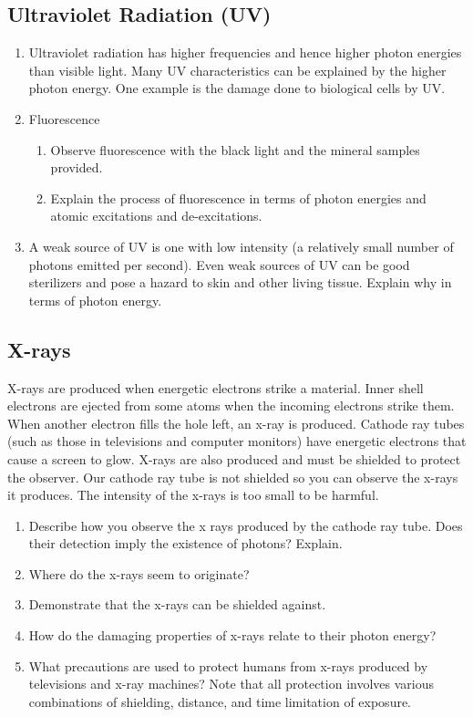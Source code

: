 \begin{multicols}{2}
	
\subsection {Ultraviolet Radiation (UV)}
\begin{enumerate}
	\item Ultraviolet radiation has higher frequencies and hence higher photon energies than visible light.  Many UV characteristics can be explained by the higher photon energy.  One example is the damage done to biological cells by UV.
	\item Fluorescence
	\begin{enumerate}
		\item Observe fluorescence with the black light and the mineral samples provided.
		\item Explain the process of fluorescence in terms of photon energies and atomic excitations and de-excitations.
	\end{enumerate}
	\item A weak source of UV is one with low intensity (a relatively small number of photons emitted per second).  Even weak sources of UV can be good sterilizers and pose a hazard to skin and other living tissue.  Explain why in terms of photon energy.
\end{enumerate}
	
\subsection {X-rays}
X-rays are produced when energetic electrons strike a material.  Inner shell electrons are ejected from some atoms when the incoming electrons strike them.  When another electron fills the hole left, an x-ray is produced.  Cathode ray tubes (such as those in televisions and computer monitors) have energetic electrons that cause a screen to glow.  X-rays are also produced and must be shielded to protect the observer.  Our cathode ray tube is not shielded so you can observe the x-rays it produces.  The intensity of the x-rays is too small to be harmful.
\begin{enumerate}[itemsep=0pt]
	\item Describe how you observe the x rays produced by the cathode ray tube.  Does their detection imply the existence of photons?  Explain.
	\item Where do the x-rays seem to originate?
	\item Demonstrate that the x-rays can be shielded against.
	\item How do the damaging properties of x-rays relate to their photon energy?
	\item What precautions are used to protect humans from x-rays produced by televisions and x-ray machines?  Note that all protection involves various combinations of shielding, distance, and time limitation of exposure.
\end{enumerate}


\end{multicols}
